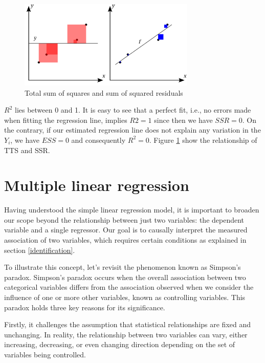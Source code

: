 \documentclass[
  12pt,
  oneside]{book}
\theoremstyle{definition}
\theoremstyle{definition}
\theoremstyle{definition}
\theoremstyle{definition}
\theoremstyle{remark}
\begin{document}
\begin{figure}
\centering
\includegraphics[width=0.75\textwidth,height=\textheight]{fig/fitR.png}
\caption{\label{fig:fitR} Total sum of squares and sum of squared residuals}
\end{figure}

\(R^2\) lies between 0 and 1. It is easy to see that a perfect fit, i.e., no errors made when fitting the regression line, implies \(R2=1\) since then we have \(SSR=0\). On the contrary, if our estimated regression line does not explain any variation in the \(Y_i\), we have \(ESS=0\) and consequently \(R^2=0\). Figure \ref{fig:fitR} show the relationship of TTS and SSR.

\hypertarget{multiple-linear-regression}{%
\section{Multiple linear regression}\label{multiple-linear-regression}}

Having understood the simple linear regression model, it is important to broaden our scope beyond the relationship between just two variables: the dependent variable and a single regressor. Our goal is to causally interpret the measured association of two variables, which requires certain conditions as explained in section \ref{identification}.

To illustrate this concept, let's revisit the phenomenon known as Simpson's paradox. Simpson's paradox occurs when the overall association between two categorical variables differs from the association observed when we consider the influence of one or more other variables, known as controlling variables. This paradox holds three key reasons for its significance.

Firstly, it challenges the assumption that statistical relationships are fixed and unchanging. In reality, the relationship between two variables can vary, either increasing, decreasing, or even changing direction depending on the set of variables being controlled.
\end{document}
